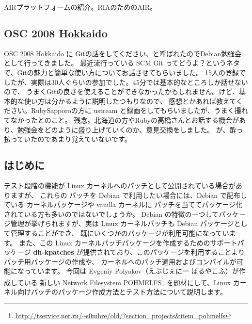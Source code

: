 \documentclass[mingoth,a4paper]{jsarticle}
\begin{document}
AIRプラットフォームの紹介。RIAのためのAIR。

\subsection{OSC 2008 Hokkaido}
OSC 2008 Hokkaido に Gitの話をしてください、と呼ばれたのでDebian勉強会として行ってきました。
最近流行っている SCM Git ってどうよ？というネタで、Gitの魅力と簡単な使い方についてお話させてもらいました。
15人の登録でしたが、実際は30人ぐらいの参加でした。45分では基本的なところしか話せないので、
うまくGitの良さを使えることができなかったかもしれません。けど、基本的な使い方は分かるように説明したつもりなので、
感想とかあれば教えてください。RubySapporoの方に ustream と録画をしてもらいましたが、うまく撮れてなかったとのこと。
残念。北海道の方やRubyの高橋さんとお話する機会があり、勉強会をどのように盛り上げていくのか、意見交換をしました。
が、酔っ払っていたのであまり覚えていないです。

\label{sec:kpatch}

\subsection{はじめに}
テスト段階の機能が Linux カーネルへのパッチとして公開されている場合がありますが、
これらの パッチを Debian で利用したい場合には、Debian で配布している カーネルパッケージや vanilla カーネルに
パッチを当ててパッケージ化されている方も多いのではないでしょうか。
Debian の特徴の一つしてパッケージ管理が挙げられますが、実は Linux カーネルパッチも Debian パッケージとして管理することができ、
既にいくつかのパッケージが利用可能になっています。
また、この Linux カーネルパッチパッケージを作成するためのサポートパッケージ {\bf dh-kpatches} 
が提供されており、このパッケージを利用することよりパッチ用パッケージの作成や、
カーネルへのパッチ適用およびコンパイルが可能になっています。
今回は Evgeniy Polyakov（えぶじぇにー ぽるやこふ）が作成している
新しい Network Filesystem POHMELFS\footnote{\url{http://tservice.net.ru/~s0mbre/old/?section=projects&item=pohmelfs}}
を題材にして、Linux カーネル向けパッチのパッケージ作成方法とテスト方法について説明します。
\end{document}

